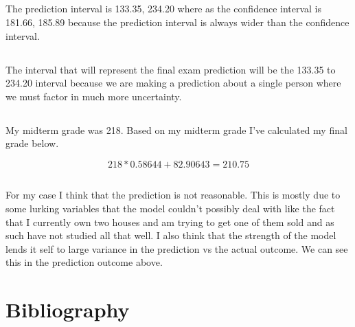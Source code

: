 \documentclass[letterpaper, onecolumn,10pt]{IEEEtran}
\begin{document}
            \subsection{}
            The prediction interval is 133.35, 234.20 where as the confidence interval is 181.66, 185.89 because the prediction interval is always wider than the confidence interval.\\
            
            \subsection{}
            The interval that will represent the final exam prediction will be the 133.35 to 234.20 interval because we are making a prediction about a single person where we must factor in much more uncertainty.\\
            
            \subsection{}
            My midterm grade was 218. Based on my midterm grade I've calculated my final grade below.
            
            \[
                218*0.58644 + 82.90643 = 210.75
            \]
            
            \subsection{}
            For my case I think that the prediction is not reasonable. This is mostly due to some lurking variables that the model couldn't possibly deal with like the fact that I currently own two houses and am trying to get one of them sold and as such have not studied all that well. I also think that the strength of the model lends it self to large variance in the prediction vs the actual outcome. We can see this in the prediction outcome above.\\
            
            
            
        
        
        
		
		
		\section{Bibliography}
		
		
\end{document}
